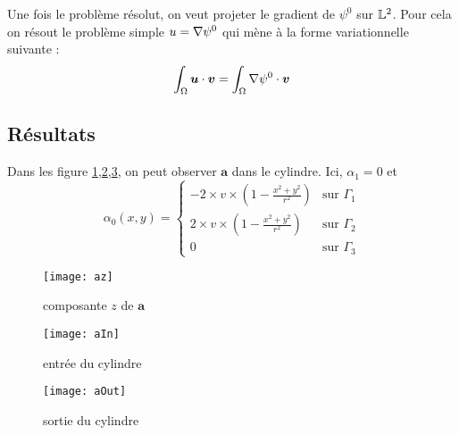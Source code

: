 

Une fois le problème résolut, on veut projeter le gradient de $\psi^0$ sur ${\mathbb{L}}^2$. Pour cela on résout le problème simple $u={\nabla}\psi^0$ qui mène à la forme variationnelle suivante :
\[ \int_\Omega \bm{u}\cdot\bm{v} = \int_\Omega {\nabla}\psi^0\cdot\bm{v} \]



\subsection{Résultats}
Dans les figure \ref{az},\ref{aIn},\ref{aOut}, on peut observer $\bm{a}$ dans le cylindre. Ici, $\alpha_1=0$ et 
\[ \alpha_0(x,y)= \begin{cases} -2\times v\times\left(1-\frac{x^2+y^2}{r^2}\right) &\mbox{sur } \Gamma_1\\
2\times v\times\left(1-\frac{x^2+y^2}{r^2}\right)&\mbox{sur } \Gamma_2\\
0 &\mbox{sur } \Gamma_3 \end{cases} \]

\begin{figure}[H]
\centering
\texttt{[image: az]}
\caption{composante $z$ de $\bm{a}$}
\label{az}
\end{figure}
\begin{figure}[H]
\centering
\texttt{[image: aIn]}
\caption{entrée du cylindre}
\label{aIn}
\end{figure}
\begin{figure}[H]
\centering
\texttt{[image: aOut]}
\caption{sortie du cylindre}
\label{aOut}
\end{figure}


